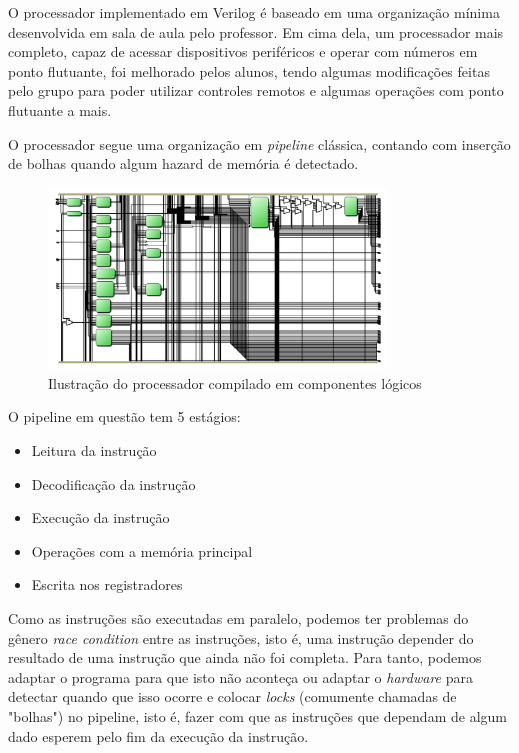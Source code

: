 \documentclass[12pt, a4paper, twocolumn]{article}
\begin{document}
O processador implementado em Verilog é baseado em uma organização mínima desenvolvida em sala de aula pelo professor. Em cima dela, um processador mais completo, capaz de acessar dispositivos periféricos e operar com números em ponto flutuante, foi melhorado pelos alunos, tendo algumas modificações feitas pelo grupo para poder utilizar controles remotos e algumas operações com ponto flutuante a mais.

O processador segue uma organização em \textit{pipeline} clássica, contando com inserção de bolhas quando algum hazard de memória é detectado.

\begin{figure}[h!]
    \centering
    \includegraphics[width=0.8\textwidth]{data_pipeline.png}
    \caption{Ilustração do processador compilado em componentes lógicos}
\end{figure}

O pipeline em questão tem 5 estágios:

\begin{itemize}
    \item Leitura da instrução
    \item Decodificação da instrução
    \item Execução da instrução
    \item Operações com a memória principal
    \item Escrita nos registradores
\end{itemize}

Como as instruções são executadas em paralelo, podemos ter problemas do gênero \textit{race condition} entre as instruções, isto é, uma instrução depender do resultado de uma instrução que ainda não foi completa. Para tanto, podemos adaptar o programa para que isto não aconteça ou adaptar o \textit{hardware} para detectar quando que isso ocorre e colocar \textit{locks} (comumente chamadas de "bolhas") no pipeline, isto é, fazer com que as instruções que dependam de algum dado esperem pelo fim da execução da instrução.
\end{document}
